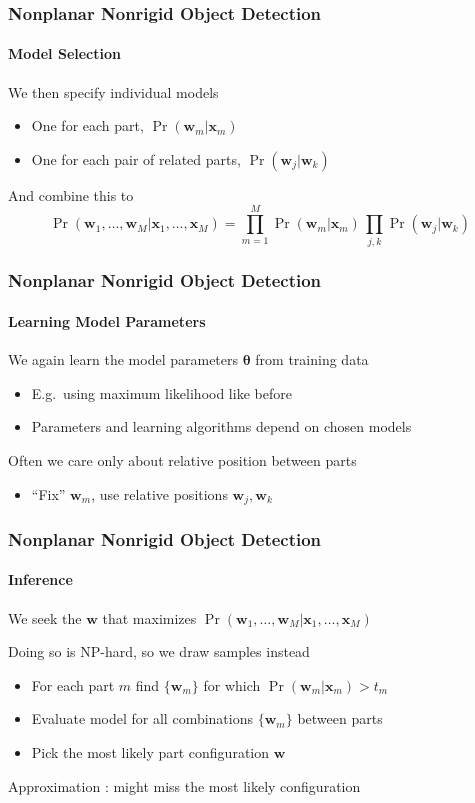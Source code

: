 \documentclass[xetex,professionalfont]{beamer}
\renewcommand{\vec}[1]{\ensuremath{\mathbf{#1}}}
\newcommand{\vw}{\vec{w}}
\newcommand{\vx}{\vec{x}}
\newcommand{\bth}{\boldsymbol{\theta}}
\begin{document}

\begin{frame}
\frametitle{Nonplanar Nonrigid Object Detection}
\framesubtitle{Model Selection}

We then specify individual models
\begin{itemize}
    \item One for each part, $\Pr(\vw_m|\vx_m)$
    \item One for each pair of related parts, $\Pr(\vw_j|\vw_k)$
\end{itemize}

\bigskip
And combine this to
\[
    \Pr(\vw_1,\dots,\vw_M|\vx_1,\dots,\vx_M) = \prod_{m=1}^M \Pr(\vw_m|\vx_m)\, \prod_{j,k}\Pr(\vw_j|\vw_k)
\]

\end{frame}


\begin{frame}
\frametitle{Nonplanar Nonrigid Object Detection}
\framesubtitle{Learning Model Parameters}

We again learn the model parameters $\bth$ from training data
\begin{itemize}
    \item E.g.\ using maximum likelihood like before
    \item Parameters and learning algorithms depend on chosen models
\end{itemize}

\bigskip
Often we care only about relative position between parts
\begin{itemize}
    \item \enquote{Fix} $\vw_m$, use relative positions $\vw_j,\vw_k$
\end{itemize}

\end{frame}


\begin{frame}
\frametitle{Nonplanar Nonrigid Object Detection}
\framesubtitle{Inference}

We seek the $\vw$ that maximizes $\Pr(\vw_1,\dots,\vw_M|\vx_1,\dots,\vx_M)$

\bigskip
Doing so is NP-hard, so we draw samples instead %
\begin{itemize}
    \item For each part $m$ find $\{\vw_m\}$ for which $\Pr(\vw_m|\vx_m)>t_m$
    \item Evaluate model for all combinations $\{\vw_m\}$ between parts
    \item Pick the most likely part configuration $\vw$
\end{itemize}

\bigskip
Approximation : might miss the most likely configuration
\end{frame}
\end{document}
